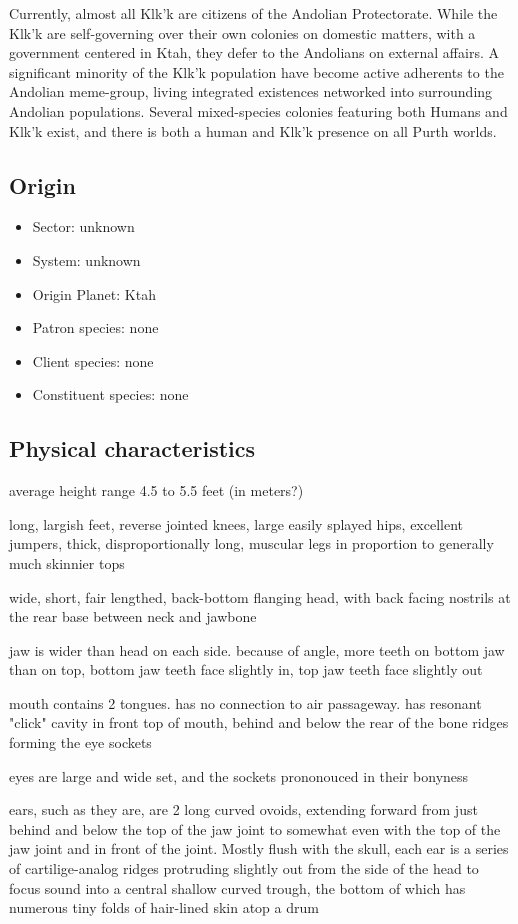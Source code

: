 Currently, almost all Klk'k are citizens of the Andolian
Protectorate. While the Klk'k are self-governing over their own
colonies on domestic matters, with a government centered in Ktah, they
defer to the Andolians on external affairs. A significant minority of
the Klk'k population have become active adherents to the Andolian
meme-group, living integrated existences networked into surrounding
Andolian populations. Several mixed-species colonies featuring both
Humans and Klk'k exist, and there is both a human and Klk'k presence
on all Purth worlds.

\subsection{Origin}
\begin{itemize}
\item Sector: unknown
\item System: unknown
\item Origin Planet: Ktah 
\item Patron species: none
\item Client species: none
\item Constituent species: none 
\end{itemize}

\subsection{Physical characteristics}
average height range 4.5 to 5.5 feet (in meters?)

long, largish feet, reverse jointed knees, large easily splayed hips,
excellent jumpers, thick, disproportionally long, muscular legs in
proportion to generally much skinnier tops

wide, short, fair lengthed, back-bottom flanging head, with back
facing nostrils at the rear base between neck and jawbone

jaw is wider than head on each side. because of angle, more teeth on
bottom jaw than on top, bottom jaw teeth face slightly in, top jaw
teeth face slightly out

mouth contains 2 tongues. has no connection to air passageway. has
resonant "click" cavity in front top of mouth, behind and below the
rear of the bone ridges forming the eye sockets

eyes are large and wide set, and the sockets prononouced in their
bonyness

ears, such as they are, are 2 long curved ovoids, extending forward
from just behind and below the top of the jaw joint to somewhat even
with the top of the jaw joint and in front of the joint.  Mostly flush
with the skull, each ear is a series of cartilige-analog ridges
protruding slightly out from the side of the head to focus sound into
a central shallow curved trough, the bottom of which has numerous tiny
folds of hair-lined skin atop a drum

